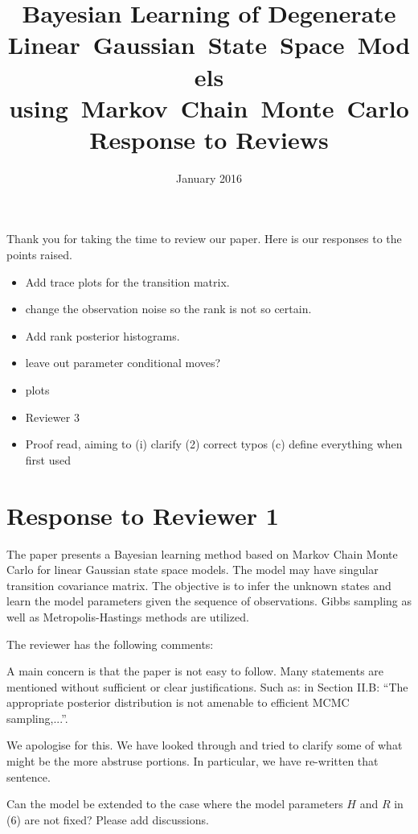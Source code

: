 \documentclass{article}
\title{Bayesian Learning of Degenerate Linear~Gaussian~State~Space~Models using~Markov~Chain~Monte~Carlo \\ Response to Reviews}
\date{January 2016}
\newenvironment{review}[0]{\begin{itshape}\color{Gray}\noindent}{\end{itshape}\vspace{0.4cm}}
\newenvironment{response}[0]{\noindent}{\vspace{0.4cm}}
\newcommand{\meta}[1]{{\color{red}\em #1}}
\begin{document}
\maketitle

Thank you for taking the time to review our paper. Here is our responses to the points raised.

\meta{
\begin{itemize}
 \item Add trace plots for the transition matrix.
 \item change the observation noise so the rank is not so certain.
 \item Add rank posterior histograms.
 \item leave out parameter conditional moves?
 \item plots
 \item Reviewer 3
 \item Proof read, aiming to (i) clarify (2) correct typos (c) define everything when first used
\end{itemize}

}

\section*{Response to Reviewer 1}

\begin{review}
The paper presents a Bayesian learning method based on Markov Chain Monte Carlo for linear Gaussian state space models. The model may have singular transition covariance matrix. The objective is to infer the unknown states and learn the model parameters given the sequence of observations. Gibbs sampling as well as Metropolis-Hastings methods are utilized.

The reviewer has the following comments:

A main concern is that the paper is not easy to follow. Many statements are mentioned without sufficient or clear justifications. Such as: in Section II.B: ``The appropriate posterior distribution is not amenable to efficient MCMC sampling,...''.
\end{review}

\begin{response}
 We apologise for this. We have looked through and tried to clarify some of what might be the more abstruse portions. In particular, we have re-written that sentence.
\end{response}

\begin{review}
Can the model be extended to the case where the model parameters $H$ and $R$ in (6) are not fixed? Please add discussions.
\end{review}
\end{document}
